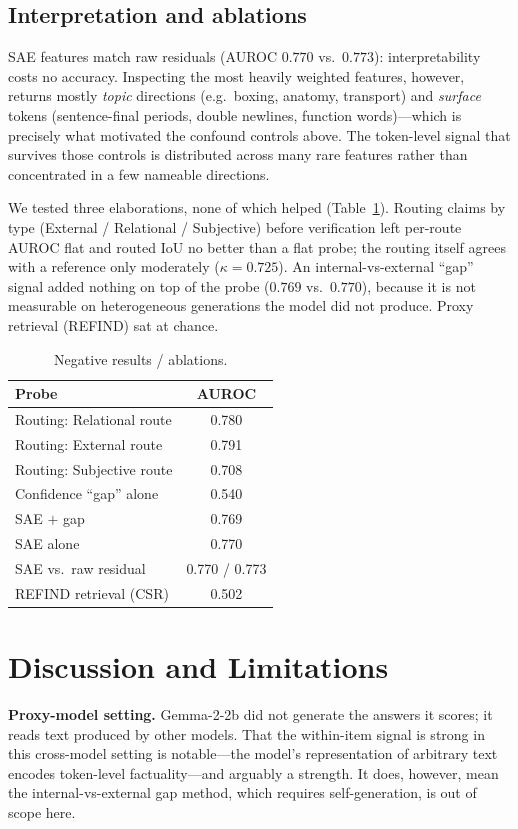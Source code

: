 \documentclass[conference]{IEEEtran}
\begin{document}
\subsection{Interpretation and ablations}
SAE features match raw residuals (AUROC $0.770$ vs.\ $0.773$): interpretability
costs no accuracy. Inspecting the most heavily weighted features, however,
returns mostly \emph{topic} directions (e.g.\ boxing, anatomy, transport) and
\emph{surface} tokens (sentence-final periods, double newlines, function
words)---which is precisely what motivated the confound controls above. The
token-level signal that survives those controls is distributed across many rare
features rather than concentrated in a few nameable directions.

We tested three elaborations, none of which helped (Table~\ref{tab:neg}).
Routing claims by type (External / Relational / Subjective) before verification
left per-route AUROC flat and routed IoU no better than a flat probe; the
routing itself agrees with a reference only moderately
($\kappa = 0.725$). An internal-vs-external ``gap'' signal added nothing on top
of the probe ($0.769$ vs.\ $0.770$), because it is not measurable on
heterogeneous generations the model did not produce. Proxy retrieval (REFIND)
sat at chance.

\begin{table}[t]
\caption{Negative results / ablations.}
\label{tab:neg}
\centering
\begin{tabular}{lc}
\toprule
Probe & AUROC \\
\midrule
Routing: Relational route & 0.780 \\
Routing: External route    & 0.791 \\
Routing: Subjective route  & 0.708 \\
Confidence ``gap'' alone   & 0.540 \\
SAE $+$ gap                & 0.769 \\
SAE alone                  & 0.770 \\
SAE vs.\ raw residual      & 0.770 / 0.773 \\
REFIND retrieval (CSR)     & 0.502 \\
\bottomrule
\end{tabular}
\end{table}

\section{Discussion and Limitations}
\textbf{Proxy-model setting.} Gemma-2-2b did not generate the answers it
scores; it reads text produced by other models. That the within-item signal is
strong in this cross-model setting is notable---the model's representation of
arbitrary text encodes token-level factuality---and arguably a strength. It
does, however, mean the internal-vs-external gap method, which requires
self-generation, is out of scope here.
\end{document}
